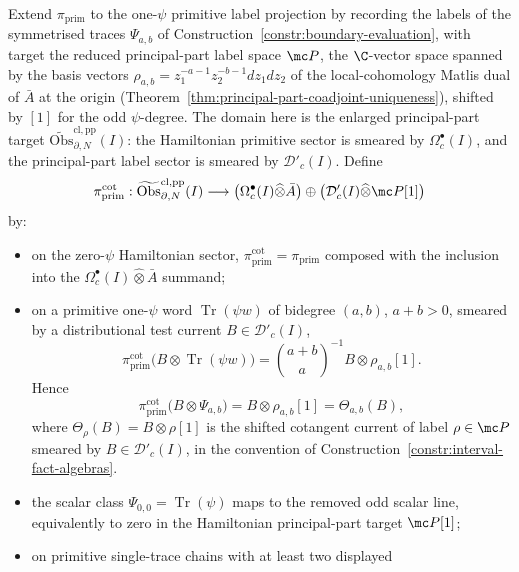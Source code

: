 \begin{constr}\label{constr:chain-level-primitive-cotangent}
  Extend $\pi_{\mathrm{prim}}$ to the one-$\psi$ primitive label projection by
  recording the labels of the symmetrised traces $\Psi_{a,b}$ of
  Construction~\ref{constr:boundary-evaluation}, with target the
  reduced principal-part label space \(\mc P\), the
  \(\C\)-vector space spanned by the basis vectors
  \(\rho_{a,b}=z_1^{-a-1}z_2^{-b-1}dz_1dz_2\) of the local-cohomology
  Matlis dual of \(\bar A\) at the origin
  (Theorem~\ref{thm:principal-part-coadjoint-uniqueness}), shifted by
  \([1]\) for the odd \(\psi\)-degree.  The domain here is the
  enlarged principal-part target
  \(\widetilde{\mathrm{Obs}}^{\mathrm{cl,pp}}_{\partial,N}(I)\): the
  Hamiltonian primitive sector is smeared by \(\Omega^\bullet_c(I)\), and
  the principal-part label sector is smeared by
  \(\mathcal D'_c(I)\).  Define
  $$\pi_{\mathrm{prim}}^{\mathrm{cot}}:
    \widetilde{\mathrm{Obs}}^{\mathrm{cl,pp}}_{\partial,N}(I)
    \longrightarrow
    \bigl(\Omega^\bullet_c(I)\widehat\otimes\bar A\bigr)
    \oplus
    \bigl(\mathcal D'_c(I)\widehat\otimes\mc P[1]\bigr)$$
  by:
  \begin{itemize}
    \item on the zero-$\psi$ Hamiltonian sector,
      $\pi_{\mathrm{prim}}^{\mathrm{cot}}=\pi_{\mathrm{prim}}$
      composed with the inclusion into the
      \(\Omega^\bullet_c(I)\widehat\otimes\bar A\) summand;
    \item on a primitive one-$\psi$ word
      \(\operatorname{Tr}(\psi w)\) of bidegree \((a,b)\), \(a+b>0\),
      smeared by a distributional test current \(B\in\mathcal D'_c(I)\),
      \[
        \pi_{\mathrm{prim}}^{\mathrm{cot}}
        \bigl(B\otimes\operatorname{Tr}(\psi w)\bigr)
        =
        \binom{a+b}{a}^{-1} B\otimes\rho_{a,b}[1].
      \]
      Hence
      \[
        \pi_{\mathrm{prim}}^{\mathrm{cot}}\bigl(B\otimes\Psi_{a,b}\bigr)
        =B\otimes\rho_{a,b}[1]
        =\Theta_{a,b}(B),
      \]
      where \(\Theta_\rho(B)=B\otimes\rho[1]\) is the shifted cotangent
      current of label \(\rho\in\mc P\) smeared by
      \(B\in\mathcal D'_c(I)\), in the convention of
      Construction~\ref{constr:interval-fact-algebras}.
    \item the scalar class \(\Psi_{0,0}=\operatorname{Tr}(\psi)\) maps to
      the removed odd scalar line, equivalently to zero in the
      Hamiltonian principal-part target \(\mc P[1]\);
    \item on primitive single-trace chains with at least two displayed

\end{itemize}
\end{constr}

